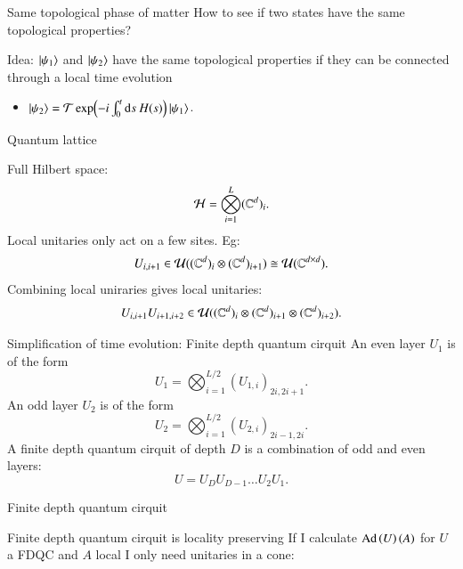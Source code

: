 \documentclass{beamer}
\begin{document}
\begin{frame}{Same topological phase of matter}
	How to see if two states have the same topological properties?
	\pause
	\begin{block}{Idea:}
		$\ket{\psi_1}$ and $\ket{\psi_2}$ have the same topological properties if they can be connected through a local time evolution
		\begin{itemize}
			\item $\ket{\psi_2}=\mathcal{T}\exp(-i\int_{0}^{t}\textrm{d} s\: H(s))\ket{\psi_1}$.
		\end{itemize}
	\end{block}
\end{frame}

\begin{frame}{Quantum lattice}
	\begin{center}
		
	\end{center}
	Full Hilbert space:
	\[\mathcal{H}=\bigotimes_{i=1}^L (\mathbb{C}^d)_i.\]
	\pause
	Local unitaries only act on a few sites. Eg:
	\[U_{i,i+1}\in\mathcal{U}((\mathbb{C}^d)_i\otimes (\mathbb{C}^d)_{i+1})\cong\mathcal{U}(\mathbb{C}^{d\times d}).\]
	\pause
	Combining local uniraries gives local unitaries:
	\[U_{i,i+1}U_{i+1,i+2}\in \mathcal{U}((\mathbb{C}^d)_i\otimes (\mathbb{C}^d)_{i+1}\otimes (\mathbb{C}^d)_{i+2}).\]
\end{frame}

\begin{frame}{Simplification of time evolution: Finite depth quantum cirquit}
	An even layer $U_1$ is of the form
	\[U_1=\bigotimes_{i=1}^{L/2}(U_{1,i})_{2i,2i+1}.\]
	\pause
	An odd layer $U_2$ is of the form
	\[U_2=\bigotimes_{i=1}^{L/2}(U_{2,i})_{2i-1,2i}.\]
	\pause
	A finite depth quantum cirquit of depth $D$ is a combination of odd and even layers:
	\[U=U_D U_{D-1}\ldots U_2U_1.\]
\end{frame}

\begin{frame}{Finite depth quantum cirquit}
	\begin{center}
		
	\end{center}
\end{frame}

\begin{frame}{Finite depth quantum cirquit is locality preserving}
	If I calculate $\textrm{Ad}\left(U\right)(A)$ for $U$ a FDQC and $A$ local I only need unitaries in a cone:
	\begin{center}
		\scalebox{0.75}{
			
		}
	\end{center}
\end{frame}
\end{document}
